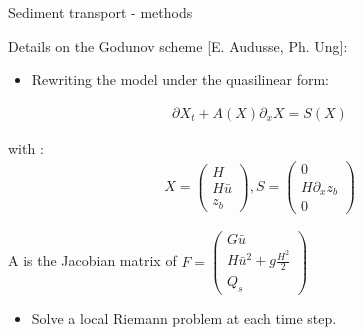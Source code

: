 
   
\begin{frame}{Sediment transport - methods}

Details on the Godunov scheme [E. Audusse, Ph. Ung]:
\begin{itemize}
\item Rewriting the model under the quasilinear form:
\end{itemize}

\begin{eqnarray}
\partial X_t + A(X)\partial_x X = S(X)
\end{eqnarray}

with :
\begin{eqnarray}
X=\left(\begin{array}{ccc}
H\\H\bar{u}\\z_b
\end{array}\right)
,
S=\left(\begin{array}{ccc}
0\\H\partial_x z_b \\0
\end{array}\right)
\end{eqnarray}


A is the Jacobian matrix of $F=\left( \begin{array}{ccc}
G\bar{u}\\H\bar{u}^2+g\frac{H^2}{2}\\Q_s
\end{array}\right)$

\begin{itemize}
\item  Solve a local Riemann problem at each time step.
\end{itemize}



\end{frame}


%

